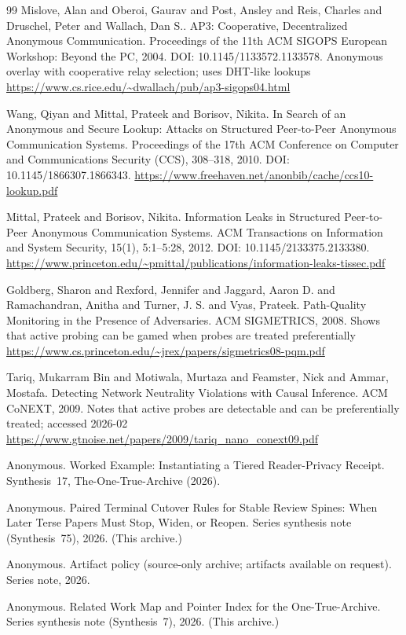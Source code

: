 \documentclass[11pt]{article}
\begin{document}
\begin{thebibliography}{99}
Mislove, Alan and Oberoi, Gaurav and Post, Ansley and Reis, Charles and Druschel, Peter and Wallach, Dan S..
\newblock AP3: Cooperative, Decentralized Anonymous Communication.
\newblock Proceedings of the 11th ACM SIGOPS European Workshop: Beyond the PC, 2004.
\newblock DOI: 10.1145/1133572.1133578.
\newblock Anonymous overlay with cooperative relay selection; uses DHT-like lookups
\newblock \url{https://www.cs.rice.edu/~dwallach/pub/ap3-sigops04.html}

Wang, Qiyan and Mittal, Prateek and Borisov, Nikita.
\newblock In Search of an Anonymous and Secure Lookup: Attacks on Structured Peer-to-Peer Anonymous Communication Systems.
\newblock Proceedings of the 17th ACM Conference on Computer and Communications Security (CCS), 308--318, 2010.
\newblock DOI: 10.1145/1866307.1866343.
\newblock \url{https://www.freehaven.net/anonbib/cache/ccs10-lookup.pdf}

Mittal, Prateek and Borisov, Nikita.
\newblock Information Leaks in Structured Peer-to-Peer Anonymous Communication Systems.
\newblock ACM Transactions on Information and System Security, 15(1), 5:1--5:28, 2012.
\newblock DOI: 10.1145/2133375.2133380.
\newblock \url{https://www.princeton.edu/~pmittal/publications/information-leaks-tissec.pdf}

Goldberg, Sharon and Rexford, Jennifer and Jaggard, Aaron D. and Ramachandran, Anitha and Turner, J. S. and Vyas, Prateek.
\newblock Path-Quality Monitoring in the Presence of Adversaries.
\newblock ACM SIGMETRICS, 2008.
\newblock Shows that active probing can be gamed when probes are treated preferentially
\newblock \url{https://www.cs.princeton.edu/~jrex/papers/sigmetrics08-pqm.pdf}

Tariq, Mukarram Bin and Motiwala, Murtaza and Feamster, Nick and Ammar, Mostafa.
\newblock Detecting Network Neutrality Violations with Causal Inference.
\newblock ACM CoNEXT, 2009.
\newblock Notes that active probes are detectable and can be preferentially treated; accessed 2026-02
\newblock \url{https://www.gtnoise.net/papers/2009/tariq_nano_conext09.pdf}

Anonymous.
\newblock Worked Example: Instantiating a Tiered Reader-Privacy Receipt.
\newblock Synthesis~17, The-One-True-Archive (2026).

Anonymous.
\newblock Paired Terminal Cutover Rules for Stable Review Spines: When Later Terse Papers Must Stop, Widen, or Reopen.
\newblock Series synthesis note (Synthesis~75), 2026. (This archive.)

Anonymous.
\newblock Artifact policy (source-only archive; artifacts available on request).
\newblock Series note, 2026.

Anonymous.
\newblock Related Work Map and Pointer Index for the One-True-Archive.
\newblock Series synthesis note (Synthesis~7), 2026. (This archive.)

\end{thebibliography}
\end{document}
